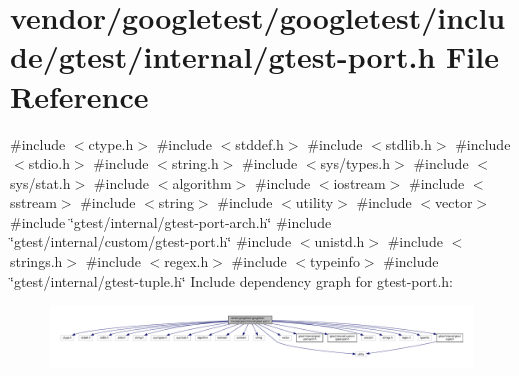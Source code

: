 \hypertarget{gtest-port_8h}{}\section{vendor/googletest/googletest/include/gtest/internal/gtest-\/port.h File Reference}
\label{gtest-port_8h}
{\ttfamily \#include $<$ctype.\+h$>$}\newline
{\ttfamily \#include $<$stddef.\+h$>$}\newline
{\ttfamily \#include $<$stdlib.\+h$>$}\newline
{\ttfamily \#include $<$stdio.\+h$>$}\newline
{\ttfamily \#include $<$string.\+h$>$}\newline
{\ttfamily \#include $<$sys/types.\+h$>$}\newline
{\ttfamily \#include $<$sys/stat.\+h$>$}\newline
{\ttfamily \#include $<$algorithm$>$}\newline
{\ttfamily \#include $<$iostream$>$}\newline
{\ttfamily \#include $<$sstream$>$}\newline
{\ttfamily \#include $<$string$>$}\newline
{\ttfamily \#include $<$utility$>$}\newline
{\ttfamily \#include $<$vector$>$}\newline
{\ttfamily \#include \char`\"{}gtest/internal/gtest-\/port-\/arch.\+h\char`\"{}}\newline
{\ttfamily \#include \char`\"{}gtest/internal/custom/gtest-\/port.\+h\char`\"{}}\newline
{\ttfamily \#include $<$unistd.\+h$>$}\newline
{\ttfamily \#include $<$strings.\+h$>$}\newline
{\ttfamily \#include $<$regex.\+h$>$}\newline
{\ttfamily \#include $<$typeinfo$>$}\newline
{\ttfamily \#include \char`\"{}gtest/internal/gtest-\/tuple.\+h\char`\"{}}\newline
Include dependency graph for gtest-\/port.h\+:
\nopagebreak
\begin{figure}[H]
\begin{center}
\leavevmode
\includegraphics[width=350pt]{gtest-port_8h__incl}
\end{center}
\end{figure}
